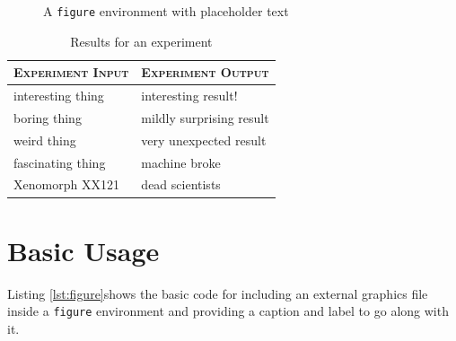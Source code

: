 \documentclass[article,a4paper,oneside,10pt]{memoir}
\begin{document}
\begin{figure}
    {\color{gray}\centering\small\lipsum[1]}
    \caption{A \texttt{figure} environment with placeholder text}
    \label{fig:lipsum}
\end{figure}

\begin{table}
    \centering
    \caption{Results for an experiment}
    \label{tab:experiment}
    \begin{tabular}{ll}
        \toprule
        \scshape Experiment Input & \scshape Experiment Output \\
        \midrule
        interesting thing         & interesting result!        \\
        boring thing              & mildly surprising result   \\
        weird thing               & very unexpected result     \\
        fascinating thing         & machine broke              \\
        Xenomorph XX121           & dead scientists            \\
        \bottomrule
    \end{tabular}
\end{table}


\chapter{Basic Usage}
\label{chap:basic-usage}


Listing \ref{lst:figure}\footnotemark  shows the  basic code for  including an
external  graphics file  inside a  \verb|figure| environment  and providing  a
caption and label to go along with it.

\end{document}
